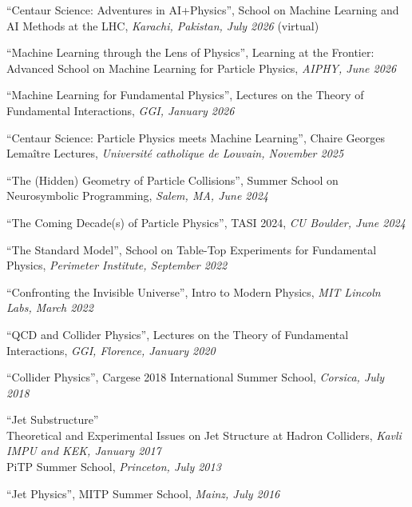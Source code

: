 \bbl

\item ``Centaur Science: Adventures in AI+Physics'', School on Machine Learning and AI Methods at the LHC, \emph{Karachi, Pakistan, July 2026} (virtual)

\item ``Machine Learning through the Lens of Physics'', Learning at the Frontier: Advanced School on Machine Learning for Particle Physics, \emph{AIPHY, June 2026}

\item ``Machine Learning for Fundamental Physics'', Lectures on the Theory of Fundamental Interactions, \emph{GGI, January 2026}

\item ``Centaur Science:  Particle Physics meets Machine Learning'', Chaire Georges Lemaître Lectures, \emph{Université catholique de Louvain, November 2025}

\item ``The (Hidden) Geometry of Particle Collisions'', Summer School on Neurosymbolic Programming, \emph{Salem, MA, June 2024}

\item ``The Coming Decade(s) of Particle Physics'', TASI 2024, \emph{CU Boulder, June 2024}

\item ``The Standard Model'', School on Table-Top Experiments for Fundamental Physics, \emph{Perimeter Institute, September 2022}

\item ``Confronting the Invisible Universe'', Intro to Modern Physics, \emph{MIT Lincoln Labs, March 2022}

\item ``QCD and Collider Physics'', Lectures on the Theory of Fundamental Interactions, \emph{GGI, Florence, January 2020}

\item ``Collider Physics'', Cargese 2018 International Summer School, \emph{Corsica, July 2018}

\item ``Jet Substructure''
\\ Theoretical and Experimental Issues on Jet Structure at Hadron Colliders, \emph{Kavli IMPU and KEK, January 2017}
\\ PiTP Summer School, \emph{Princeton, July 2013}

\item ``Jet Physics'', MITP Summer School, \emph{Mainz, July 2016}

